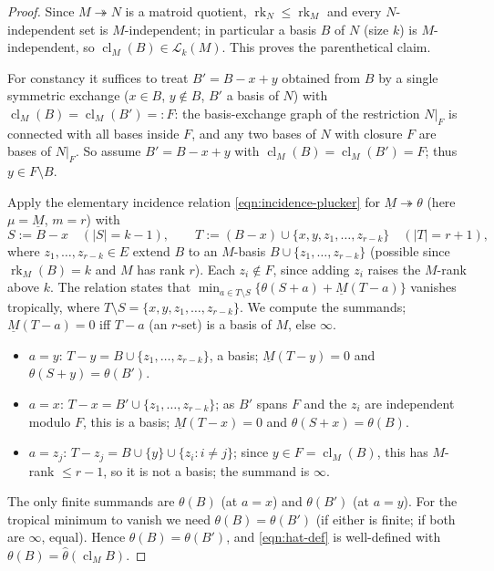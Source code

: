 \documentclass{article}
\theoremstyle{definition}
\newcommand{\rk}{\operatorname{rk}}
\newcommand{\cl}{\operatorname{cl}}
\newcommand{\onto}{\twoheadrightarrow}
\newcommand{\cLL}{\mathcal{L}}
\begin{document}
\begin{proof}
Since $M\onto N$ is a matroid quotient, $\rk_N\le\rk_M$ and every $N$-independent set is
$M$-independent; in particular a basis $B$ of $N$ (size $k$) is $M$-independent, so $\cl_M(B)\in
\cLL_k(M)$. This proves the parenthetical claim.

For constancy it suffices to treat $B'=B-x+y$ obtained from $B$ by a single symmetric exchange
($x\in B$, $y\notin B$, $B'$ a basis of $N$) with $\cl_M(B)=\cl_M(B')=:F$: the basis-exchange graph of
the restriction $N|_F$ is connected with all bases inside $F$, and any two bases of $N$ with closure
$F$ are bases of $N|_F$. So assume $B'=B-x+y$ with $\cl_M(B)=\cl_M(B')=F$; thus $y\in F\setminus B$.

Apply the elementary incidence relation \eqref{eqn:incidence-plucker} for $\underline M\onto\theta$
(here $\mu=\underline M$, $m=r$) with
\[
  S:=B-x\quad(|S|=k-1),\qquad T:=(B-x)\cup\{x,y,z_1,\dots,z_{r-k}\}\quad(|T|=r+1),
\]
where $z_1,\dots,z_{r-k}\in E$ extend $B$ to an $M$-basis $B\cup\{z_1,\dots,z_{r-k}\}$ (possible since
$\rk_M(B)=k$ and $M$ has rank $r$). Each $z_i\notin F$, since adding $z_i$ raises the $M$-rank above
$k$. The relation states that $\min_{a\in T\setminus S}\{\theta(S+a)+\underline M(T-a)\}$ vanishes
tropically, where $T\setminus S=\{x,y,z_1,\dots,z_{r-k}\}$. We compute the summands; $\underline
M(T-a)=0$ iff $T-a$ (an $r$-set) is a basis of $M$, else $\infty$.
\begin{itemize}
\item $a=y$: $T-y=B\cup\{z_1,\dots,z_{r-k}\}$, a basis; $\underline M(T-y)=0$ and
$\theta(S+y)=\theta(B')$.
\item $a=x$: $T-x=B'\cup\{z_1,\dots,z_{r-k}\}$; as $B'$ spans $F$ and the $z_i$ are independent modulo
$F$, this is a basis; $\underline M(T-x)=0$ and $\theta(S+x)=\theta(B)$.
\item $a=z_j$: $T-z_j=B\cup\{y\}\cup\{z_i:i\ne j\}$; since $y\in F=\cl_M(B)$, this has $M$-rank
$\le r-1$, so it is not a basis; the summand is $\infty$.
\end{itemize}
The only finite summands are $\theta(B)$ (at $a=x$) and $\theta(B')$ (at $a=y$). For the tropical
minimum to vanish we need $\theta(B)=\theta(B')$ (if either is finite; if both are $\infty$, equal).
Hence $\theta(B)=\theta(B')$, and \eqref{eqn:hat-def} is well-defined with $\theta(B)=\widehat\theta
(\cl_M B)$.
\end{proof}
\end{document}
